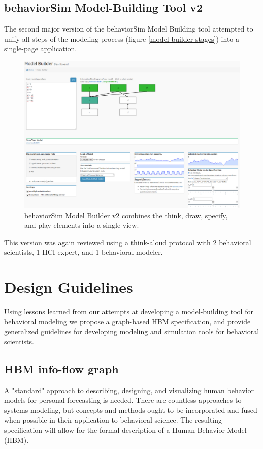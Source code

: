 \documentclass[conference]{IEEEtran}
\begin{document}
\subsection{behaviorSim Model-Building Tool v2}
The second major version of the behaviorSim Model Building tool attempted to unify all steps of the modeling process (figure \ref{model-builder-stages}) into a single-page application.

\begin{figure}[!t]
  \centering
  \includegraphics[width=0.9\columnwidth]{img/v2}  
  \caption{behaviorSim Model Builder v2 combines the think, draw, specify, and play elements into a single view.}
  \label{model-builder-v2}
\end{figure}

This version was again reviewed using a think-aloud protocol with 2 behavioral scientists, 1 HCI expert, and 1 behavioral modeler.

  


  
\section{Design Guidelines}
Using lessons learned from our attempts at developing a model-building tool for behavioral modeling we propose a graph-based HBM specification, and provide generalized guidelines for developing modeling and simulation tools for behavioral scientists.

\subsection{HBM info-flow graph}
A "standard" approach to describing, designing, and visualizing human behavior models for personal forecasting is needed.
There are countless approaches to systems modeling, but concepts and methods ought to be incorporated and fused when possible in their application to behavioral science.
The resulting specification will allow for the formal description of a Human Behavior Model (HBM).
\end{document}
